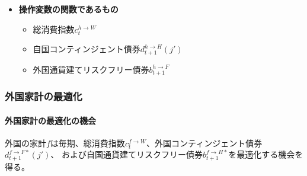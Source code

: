 \begin{itemize}
        自身の財の価格\(p_t^h\)についても、家計としての計算においてはすべて所与（定数）として扱う。
    \item
    \label{itm:household_optimization_home_calculation_remark2}
        \textbf{操作変数の関数であるもの}
        \begin{itemize}
            \item 総消費指数\(c_t^{h\to W}\)
            \item 自国コンティンジェント債券\(d_{t+1}^{h\to H}(j')\)
            \item 外国通貨建てリスクフリー債券\(b_{t+1}^{h\to F}\)
        \end{itemize}
\end{itemize}

\subsubsection{外国家計の最適化}
\label{sec:household_optimization_foreign}

\paragraph{外国家計の最適化の機会}
\label{sec:household_optimization_foreign_opportunity}
外国の家計\(f\)は毎期、総消費指数\(c_t^{f\to W}\)、外国コンティンジェント債券\(d_{t+1}^{f\to F*}(j')\)、
および自国通貨建てリスクフリー債券\(b_{t+1}^{f\to H*}\)を最適化する機会を得る。

